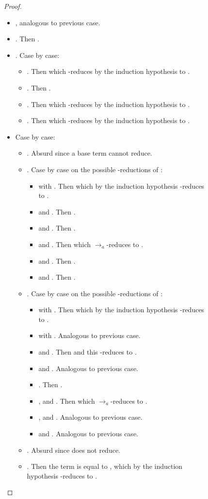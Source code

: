 \documentclass{LMCS}
\newcommand{\xto}[1]{\ensuremath{\rightarrow_{#1}}}
\newcommand{\toalgred}{\xto{a}}
\begin{document}
\begin{figure}
{\begin{proof}
\begin{description}
\begin{itemize}
	\item , analogous to previous case.
	\item . Then .
	\item . Case by case:
	  \begin{itemize}
	    \item .  Then  which -reduces by the induction hypothesis to .
	    \item . Then .
	    \item . Then   which -reduces by the induction hypothesis to .
	    \item . Then   which -reduces by the induction hypothesis to .
	  \end{itemize}
	\item  Case by case:
	  \begin{itemize}
	    \item . Absurd since a base term cannot reduce.
	    \item . Case by case on the possible -reductions of :
	      \begin{itemize}
		\item  with . Then  which by the induction hypothesis -reduces to .
		\item  and . Then .
		\item  and . Then .
		\item  and . Then  which \toalgred-reduces to .
		\item  and . Then .
		\item  and . Then .
	      \end{itemize}
	    \item . Case by case on the possible -reductions of :
	      \begin{itemize}
		\item  with . Then  which by the induction hypothesis -reduces to .
		\item  with . Analogous to previous case.
		\item  and . Then  and this -reduces to .
		\item  and . Analogous to previous case.
		\item . Then .
		\item ,  and . Then  which \toalgred-reduces to .
		\item ,  and . Analogous to previous case.
		\item  and . Analogous to previous case.
	      \end{itemize}
	    \item . Absurd since  does not reduce.
	    \item . Then the term  is equal to , which by the induction hypothesis -reduces to .

\end{itemize}
\end{itemize}
\end{description}
\end{proof}}
\end{figure}
\end{document}
